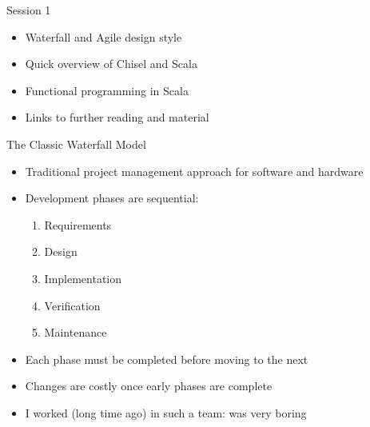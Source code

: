 \begin{frame}[fragile]{Session 1}
\begin{itemize}
\item Waterfall and Agile design style
\item Quick overview of Chisel and Scala
\item Functional programming in Scala
\item Links to further reading and material
\end{itemize}
\end{frame}


\begin{frame}{The Classic Waterfall Model}
\begin{itemize}
    \item Traditional project management approach for software and hardware
    \item Development phases are sequential:
    \begin{enumerate}
        \item Requirements
        \item Design
        \item Implementation
        \item Verification
        \item Maintenance
    \end{enumerate}
    \item Each phase must be completed before moving to the next
    \item Changes are costly once early phases are complete
    \item I worked (long time ago) in such a team: was very boring
\end{itemize}
\end{frame}

